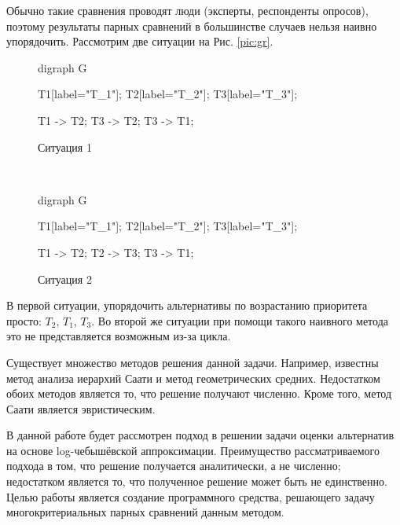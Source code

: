 \documentclass[specialist,
	substylefile = spbu.rtx,
	subf,href,colorlinks=true, 12pt]{disser}
\begin{document}
Обычно такие сравнения проводят люди (эксперты, респонденты опросов), поэтому результаты парных сравнений в большинстве случаев нельзя наивно упорядочить. Рассмотрим две ситуации на Рис. \ref{pic:gr}.
\begin{figure*}[h]
	\centering
	\begin{subfigure}[t]{0.5\textwidth}
	  \centering

  		\begin{dot2tex}[tikz,options=-t math] 
  	digraph G {
  		T1[label="T_1"];
  		T2[label="T_2"];
  		T3[label="T_3"];
  		
  		T1 -> T2;
  		T3 -> T2;
  		T3 -> T1;
  	}
  \end{dot2tex}
	   \caption{Ситуация 1}
	\end{subfigure}%
	~ 
	\begin{subfigure}[t]{0.5\textwidth}
		\centering
      \begin{dot2tex}[tikz,options=-t math]
	digraph G {
		T1[label="T_1"];
		T2[label="T_2"];
		T3[label="T_3"];
		
		T1 -> T2;
		T2 -> T3;
		T3 -> T1;
	}
\end{dot2tex}
		\caption{Ситуация 2}
	\end{subfigure}
	\caption{Примеры возможных результатов парных сравнений. $T_i \rightarrow T_j$ означает	\enquote{$T_i$ лучше $T_j$} \label{pic:gr}}
\end{figure*}
В первой ситуации, упорядочить альтернативы по возрастанию приоритета просто: $T_2$, $T_1$, $T_3$. Во второй же ситуации при помощи такого наивного метода это не представляется возможным из-за цикла.

Существует множество методов решения данной задачи. Например, известны метод анализа иерархий Саати \cite{saaty_analytic_1980} и метод геометрических средних. Недостатком обоих методов является то, что решение получают численно. Кроме того, метод Саати является эвристическим.

В данной работе будет рассмотрен подход \cite{krivulin2019} в решении задачи оценки альтернатив на основе log-чебышёвской аппроксимации.
Преимущество рассматриваемого подхода в том, что решение получается аналитически, а не численно; недостатком является то, что полученное решение может быть не единственно.
\newpage
Целью работы является создание программного средства, решающего задачу многокритериальных парных сравнений данным методом.
\end{document}

